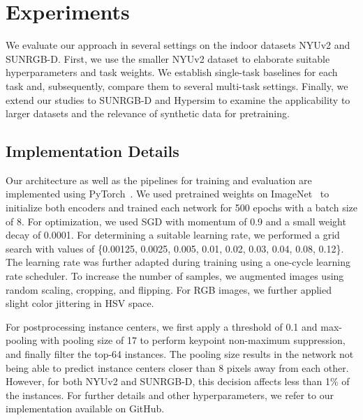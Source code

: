 \documentclass[conference]{IEEEtran}
\begin{document}
 \section{Experiments}
\label{sec:experiments}
We evaluate our approach in several settings on the indoor datasets NYUv2 and SUNRGB-D.
First, we use the smaller NYUv2 dataset to elaborate suitable hyperparameters and task weights. 
We establish single-task baselines for each task and, subsequently, compare them to several multi-task settings.
Finally, we extend our studies to SUNRGB-D and Hypersim to examine the applicability to larger datasets and the relevance of synthetic data for pretraining.

\subsection{Implementation Details}
\label{sec:experiments:implementation}
Our architecture as well as the pipelines for training and evaluation are implemented using PyTorch~\cite{pytorch-neurips2019}.
We used pretrained weights on ImageNet~\cite{ImageNet-ijcv2015} to initialize both encoders and trained each network for 500 epochs with a batch size of 8.
For optimization, we used SGD with momentum of 0.9 and a small weight decay of 0.0001.
For determining a suitable learning rate, we performed a grid search with values of \{0.00125, 0.0025, 0.005, 0.01, 0.02, 0.03, 0.04, 0.08, 0.12\}.
The learning rate was further adapted during training using a one-cycle learning rate scheduler.
To increase the number of samples, we augmented images using random scaling, cropping, and flipping. 
For RGB images, we further applied slight color jittering in HSV space.

For postprocessing instance centers, we first apply a threshold of 0.1 and max-pooling with pooling size of 17 to perform keypoint non-maximum suppression, and finally filter the top-64 instances.
The pooling size results in the network not being able to predict instance centers closer than 8 pixels away from each other.
However, for both NYUv2 and SUNRGB-D, this decision affects less than 1\% of the instances.
For further details and other hyperparameters, we refer to our implementation available on GitHub.
\end{document}
